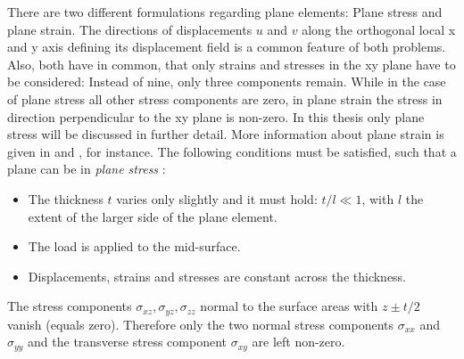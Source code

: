   There are two different formulations regarding plane elements: Plane stress and plane strain. The directions of displacements $u$ and $v$ along the orthogonal local x and y axis defining its displacement field is a common feature of both problems. Also, both have in common, that only strains and stresses in the xy plane have to be considered: Instead of nine, only three components remain. While in the case of plane stress all other stress components are zero, in plane strain the stress in direction perpendicular to the xy plane is non-zero. In this thesis only plane stress will be discussed in further detail. More information about plane strain is given in \cite{zienkiewicz2000finite} and \cite{braess2007finite}, for instance.
  The following conditions must be satisfied, such that a plane can be in \textit{plane stress} \cite{steinke2005finite}:
  \begin{itemize}
  	\item The thickness $t$ varies only slightly and it must hold: $t/l \ll 1$, with $l$ the extent of the larger side of the plane element.
  	\item The load is applied to the mid-surface.
  	\item Displacements, strains and stresses are constant across the thickness.
  \end{itemize}
  The stress components $\sigma_{xz},\sigma_{yz},\sigma_{zz}$ normal to the surface areas with $z \pm t/2$ vanish (equals zero). Therefore only the two normal stress components $\sigma_{xx}$ and $\sigma_{yy}$ and the transverse stress component $\sigma_{xy}$ are left non-zero.
    
